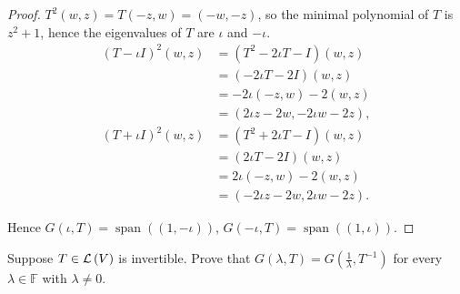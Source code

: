 \begin{proof}
    $T^{2}(w, z) = T(-z, w) = (-w, -z)$, so the minimal polynomial of $T$ is $z^{2} + 1$, hence the eigenvalues of $T$ are $\iota$ and $-\iota$.
    \begin{align*}
        {(T - \iota I)}^{2}(w, z) & = (T^{2} - 2\iota T - I)(w, z)     \\
                                  & = (-2\iota T - 2I)(w, z)           \\
                                  & = -2\iota(-z, w) -2(w, z)          \\
                                  & = (2\iota z - 2w, -2\iota w - 2z), \\
        {(T + \iota I)}^{2}(w, z) & = (T^{2} + 2\iota T - I)(w, z)     \\
                                  & = (2\iota T - 2I)(w, z)            \\
                                  & = 2\iota (-z, w) - 2(w, z)         \\
                                  & = (-2\iota z - 2w, 2\iota w - 2z).
    \end{align*}

    Hence $G(\iota, T) = \operatorname{span}((1, -\iota))$, $G(-\iota, T) = \operatorname{span}((1, \iota))$.
\end{proof}
\newpage

\begin{exercise}\label{chapter8:sectionB:exercise2}
    Suppose $T\in\mathcal{L}\left({V}\right)$ is invertible. Prove that $G(\lambda, T) = G\left(\frac{1}{\lambda}, T^{-1}\right)$ for every $\lambda\in\mathbb{F}$ with $\lambda\ne 0$.
\end{exercise}

